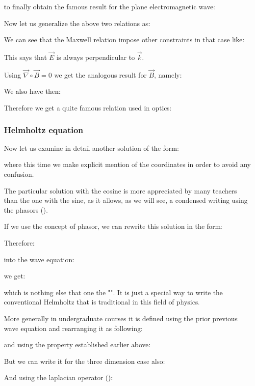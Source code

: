 	to finally obtain the famous result for the plane electromagnetic wave:
	
	Now let us generalize the above two relations as:
	
	We can see that the Maxwell relation impose other constraints in that case like:
	
	This says that $\vec{E}$ is always perpendicular to $\vec{k}$.
	
	Using $\vec{\nabla} \circ \vec{B}=0$ we get the analogous result for $\vec{B}$, namely:
	
	We also have then:
	
	Therefore we get a quite famous relation used in optics\label{wave equation by wave vector}:
	
	
	\subsubsection{Helmholtz equation}
	Now let us examine in detail another solution of the form:
	
	where this time we make explicit mention of the coordinates in order to avoid any confusion.
	\begin{tcolorbox}[title=Remark,colframe=black,arc=10pt]
	The particular solution with the cosine is more appreciated by many teachers than the one with the sine, as it allows, as we will see, a condensed writing using the phasors ().
	\end{tcolorbox}
	If we use the concept of phasor, we can rewrite this solution in the form:
	
	Therefore:
	
	into the wave equation:
	
	we get:
	
	which is nothing else that one the "". It is just a special way to write the conventional Helmholtz that is traditional in this field of physics.

	More generally in undergraduate courses it is defined using the prior previous wave equation and rearranging it as following:
	
	and using the property established earlier above:
	
	But we can write it for the three dimension case also:
	
	And using the laplacian operator ():
	
